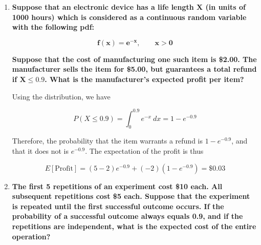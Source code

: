 \documentclass[10pt, oneside]{article}
\begin{document}
\begin{enumerate}[label=7.\arabic*]
\begin{tcolorbox}[
  colback=Cerulean!5!white,
  colframe=Cerulean!75!black]
\[ \bm{f(x) = \frac{3}{5} 10^{-5} x (100-x), \qquad 0 \leq x \leq 100} \]

\textbf{Suppose that $\bm{P}$, the net profit realized in selling this alloy (per pound), is the following function of the percent content of lead: $\bm{P = C_1 + C_2 X}$. Compute the expected profit (per pound).}
\end{tcolorbox}

The insight to remember is the linear operator property of expectation, namely

\[ E[P] = C_1 + C_2 E[X] \]

where

\[ E[X] = \int^{100}_0 \frac{3}{5} 10^{-5} x^2 (100-x) \ dx = 50 \]

Therefore

\[E[P] = \boxed{C_1 + 50 C_2} \]

\item  \begin{tcolorbox}[
  colback=Cerulean!5!white,
  colframe=Cerulean!75!black]
\textbf{Suppose that an electronic device has a life length $\bm{X}$ (in units of 1000 hours) which is considered as a continuous random variable with the following pdf:}

\[ \bm{f(x) = e^{-x}, \qquad x > 0} \]

\textbf{Suppose that the cost of manufacturing one such item is \$2.00. The manufacturer sells the item for \$5.00, but guarantees a total refund if $\bm{X \leq 0.9}$. What is the manufacturer's expected profit per item?}
\end{tcolorbox}

Using the distribution, we have

\[ P(X \leq 0.9) = \int^{0.9}_0 e^{-x} \ dx = 1 - e^{-0.9} \]

Therefore, the probability that the item warrants a refund is $1 - e^{-0.9}$, and that it does not is $e^{-0.9}$. The expectation of the profit is thus

\[ E[\text{Profit}] = (5-2) e^{-0.9} + (-2) (1 - e^{-0.9}) = \boxed{\$ 0.03} \]

\item  \begin{tcolorbox}[
  colback=Cerulean!5!white,
  colframe=Cerulean!75!black]
\textbf{The first 5 repetitions of an experiment cost \$10 each. All subsequent repetitions cost \$5 each. Suppose that the experiment is repeated until the first successful outcome occurs. If the probability of a successful outcome always equals 0.9, and if the repetitions are independent, what is the expected cost of the entire operation?}
\end{tcolorbox}


\end{enumerate}
\end{document}
